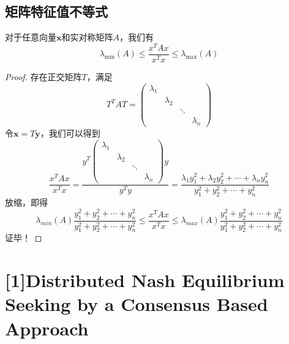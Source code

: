\documentclass[lang=cn,10pt]{elegantbook}
\newcommand\bv[1]{\boldsymbol{#1}}
\begin{document}
\section{矩阵特征值不等式}
\begin{theorem}
	对于任意向量$\bv{x}$和实对称矩阵$A$，我们有
	\begin{equation}
		\lambda_{\mathrm{min}}\left(A\right)\leq\frac{x^{T}Ax}{x^{T}x}\leq\lambda_{\mathrm{max}}\left(A\right)
	\end{equation}
\end{theorem}
\begin{proof}
	存在正交矩阵$T$，满足
	\begin{equation*}
		T^TAT = \begin{pmatrix}
			\lambda_1 &           &        &           \\
			          & \lambda_2 &        &           \\
			          &           & \ddots &           \\
			          &           &        & \lambda_n
		\end{pmatrix}
	\end{equation*}
	令$\bv{x} = T\bv{y}$，我们可以得到
	\begin{equation*}
		\frac{x^{T}Ax}{x^{T}x}=\frac{y^{T}\left(
			\begin{matrix}\lambda_{1} &             &        & \\
                          & \lambda_{2} &        & \\
                          &             & \ddots & \\&&&\lambda_{n}
				\end{matrix}\right)y}{y^{T}y}
		=\frac{\lambda_{1}y_{1}^{2}+\lambda_{2}y_{2}^{2}+\cdots+\lambda_{n}y_{n}^{2}}{y_{1}^{2}+{y}_{2}^{2}+\cdots+{y}_{n}^{2}}
	\end{equation*}
	放缩，即得
	\begin{equation*}
		\lambda_{min}(A)\frac{y_{1}^{2}+y_{2}^{2}+\cdots+y_{n}^{2}}{y_{1}^{2}+y_{2}^{2}+\cdots+y_{n}^{2}}
		\leq \frac{x^{T}Ax}{x^{T}x}
		\leq \lambda_{max}(A)\frac{y_{1}^{2}+y_{2}^{2}+\cdots+y_{n}^{2}}{y_{1}^{2}+y_{2}^{2}+\cdots+y_{n}^{2}}
	\end{equation*}
	证毕！
\end{proof}







\appendix

\chapter{[1]Distributed Nash Equilibrium Seeking by a Consensus Based Approach}
\end{document}
